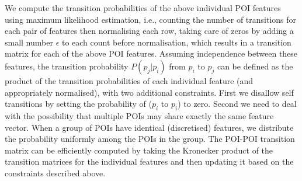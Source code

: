 We compute the transition probabilities of the above individual POI features
using maximum likelihood estimation,
i.e., counting the number of transitions for each pair of features then normalising each row,
taking care of zeros by adding a small number $\epsilon$
to each count before normalisation,
which results in a transition matrix for each of the above POI features.
%
Assuming independence between these features,
the transition probability $P(p_j | p_i)$ from $p_i$ to $p_j$ can be defined as the product
of the transition probabilities of each individual feature (and appropriately normalised),
with two additional constraints.
First we disallow self transitions by setting the probability of ($p_i$ to $p_i$) to zero.
Second we need to deal with the possibility that multiple POIs may share exactly the same feature vector.
When a group of POIs have identical (discretised) features, we distribute the probability uniformly among the POIs in the group. 
The POI-POI transition matrix can be efficiently computed by taking the Kronecker product of
the transition matrices for the individual features and then updating it based on the constraints described above.
